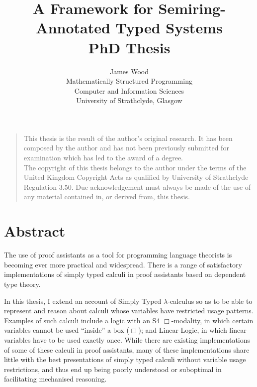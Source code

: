 \documentclass[a4paper,oneside,11pt]{book}
\title{A Framework for Semiring-Annotated Typed Systems \\ PhD Thesis}
\author{James Wood
\\ \small Mathematically Structured Programming\\[-0.8ex]
\small Computer and Information Sciences\\[-0.8ex]
\small University of Strathclyde, Glasgow\\
}
\theoremstyle{definition}
\begin{document}
\maketitle


\frontmatter

\vspace*{\fill}
\noindent
\begin{quote}
  \centering
  This thesis is the result of the author's original research. It has been composed by the author and has not been previously submitted for examination which has led to the award of a degree. \\[5pt]
  The copyright of this thesis belongs to the author under the terms of the United Kingdom Copyright Acts as qualified by University of Strathclyde Regulation 3.50. Due acknowledgement must always be made of the use of any material contained in, or derived from, this thesis. \\[5pt]
\end{quote}
\vspace*{\fill}



\chapter{Abstract}

The use of proof assistants as a tool for programming language theorists is
becoming ever more practical and widespread.
There is a range of satisfactory implementations of simply typed calculi in
proof assistants based on dependent type theory.

In this thesis, I extend an account of Simply Typed $\lambda$-calculus so as to
be able to represent and reason about calculi whose variables have restricted
usage patterns.
Examples of such calculi include a logic with an S4 $\Box$-modality, in which
certain variables cannot be used ``inside'' a box ($\Box$); and Linear Logic, in
which linear variables have to be used exactly once.
While there are existing implementations of some of these calculi in proof
assistants, many of these implementations share little with the best
presentations of simply typed calculi without variable usage restrictions, and
thus end up being poorly understood or suboptimal in facilitating mechanised
reasoning.
\end{document}
